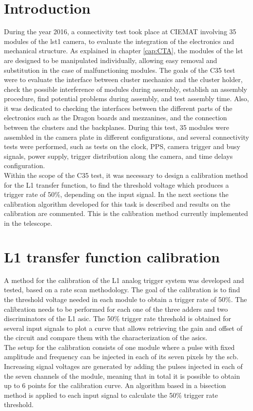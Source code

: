 \documentclass[main.tex]{subfiles}
\begin{document}
\glsresetall

\section{Introduction}

During the year 2016, a connectivity test took place at CIEMAT involving 35 modules of the \gls{lst}1 camera, to evaluate the integration of the electronics and mechanical structure. As explained in chapter \ref{cap:CTA}, the modules of the \gls{lst} are designed to be manipulated individually, allowing easy removal and substitution in the case of malfunctioning modules. The goals of the C35 test were to evaluate the interface between cluster mechanics and the cluster holder, check the possible interference of modules during assembly, establish an assembly procedure, find potential problems during assembly, and test assembly time. Also, it was dedicated to checking the interfaces between the different parts of the electronics such as the Dragon boards and mezzanines, and the connection between the clusters and the backplanes. During this test, 35 modules were assembled in the camera plate in different configurations, and several connectivity tests were performed, such as tests on the clock, PPS, camera trigger and busy signals, power supply, trigger distribution along the camera, and time delays configuration.\\
Within the scope of the C35 test, it was necessary to design a calibration method for the L1 transfer function, to find the threshold voltage which produces a trigger rate of 50\%, depending on the input signal.
In the next sections the calibration algorithm developed for this task is described and results on the calibration are commented. This is the calibration method currently implemented in the telescope.

\section{L1 transfer function calibration}

A method for the calibration of the L1 analog trigger system was developed and tested, based on a rate scan methodology. The goal of the calibration is to find the threshold voltage needed in each module to obtain a trigger rate of 50\%. The calibration needs to be performed for each one of the three adders and two discriminators of the L1 \gls{asic}. The 50\% trigger rate threshold is obtained for several input signals to plot a curve that allows retrieving the gain and offset of the circuit and compare them with the characterization of the \glspl{asic}. \\
The setup for the calibration consists of one module where a pulse with fixed amplitude and frequency can be injected in each of its seven pixels by the \gls{scb}. Increasing signal voltages are generated by adding the pulses injected in each of the seven channels of the module, meaning that in total it is possible to obtain up to 6 points for the calibration curve.
An algorithm based in a bisection method is applied to each input signal to calculate the 50\% trigger rate threshold.
\end{document}
